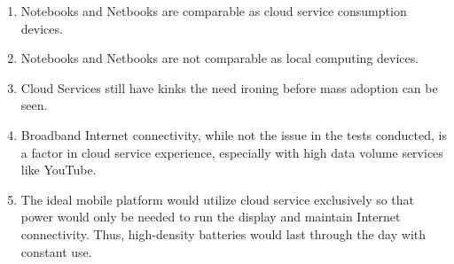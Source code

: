 \documentclass[letterpaper]{article}
\begin{document}
{\begin{center}
\end{center}

\begin{enumerate}

\item Notebooks and Netbooks are comparable as cloud service consumption
  devices.

\item Notebooks and Netbooks are not comparable as local computing devices.

\item Cloud Services still have kinks the need ironing before mass adoption can
  be seen.

\item Broadband Internet connectivity, while not the issue in the tests
  conducted, is a factor in cloud service experience, especially with high data
  volume services like YouTube.

\item The ideal mobile platform would utilize cloud service exclusively so that
  power would only be needed to run the display and maintain Internet
  connectivity.  Thus, high-density batteries would last through the day with
  constant use.

\end{enumerate}

}
\end{document}
